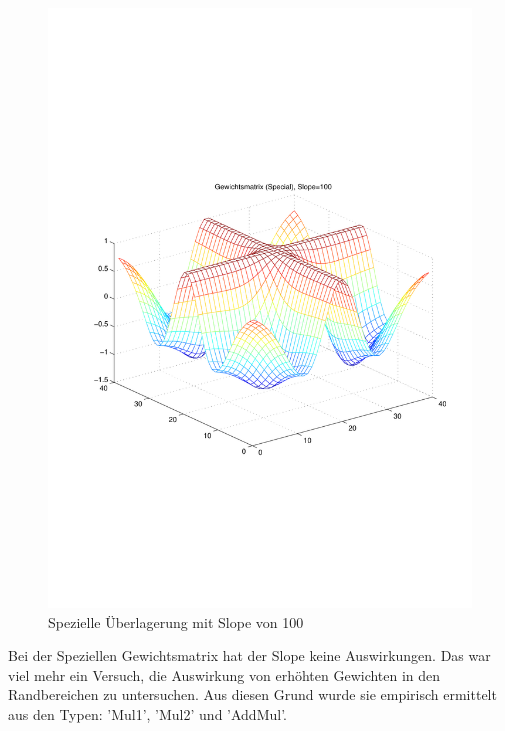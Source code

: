 \begin{figure}[hbt]
	\centering
	\includegraphics[width=0.6\linewidth]{./Bilder/Auswertung/Gewichtsmatrix/Gewichtsmatrix_Special_Slope_100}
	\caption{Spezielle Überlagerung mit Slope von 100}
	\label{Spez100}
\end{figure}

Bei der Speziellen Gewichtsmatrix hat der Slope keine Auswirkungen. Das war viel mehr ein Versuch, die Auswirkung von erhöhten Gewichten in den Randbereichen zu untersuchen. Aus diesen Grund wurde sie empirisch ermittelt aus den Typen: 'Mul1', 'Mul2' und 'AddMul'.